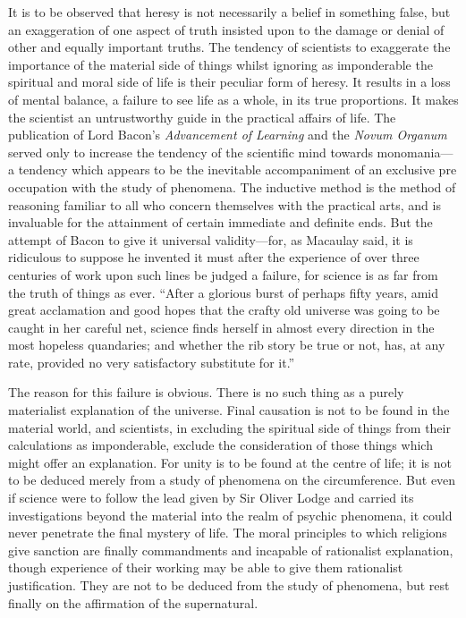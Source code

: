 \documentclass{book}
\begin{document}
It is to be observed that heresy is not necessarily a belief in something false, but an exaggeration of one aspect of truth insisted upon to the damage or denial of other and equally important truths. The tendency of scientists to exaggerate the importance of the material side of things whilst ignoring as imponderable the spiritual and moral side of life is their peculiar form of heresy. It results in a loss of mental balance, a failure to see life as a whole, in its true proportions. It makes the scientist an untrustworthy guide in the practical affairs of life. The publication of Lord Bacon’s \emph{Advancement of Learning} and the \emph{Novum Organum} served only to increase the tendency of the scientific mind towards monomania—a tendency which appears to be the inevitable accompaniment of an exclusive pre occupation with the study of phenomena. The inductive method is the method of reasoning familiar to all who concern themselves with the practical arts, and is invaluable for the attainment of certain immediate and definite ends. But the attempt of Bacon to give it universal validity—for, as Macaulay said, it is ridiculous to suppose he invented it must after the experience of over three centuries of work upon such lines be judged a failure, for science is as far from the truth of things as ever. “After a glorious burst of perhaps fifty years, amid great acclamation and good hopes that the crafty old universe was going to be caught in her careful net, science finds herself in almost every direction in the most hopeless quandaries; and whether the rib story be true or not, has, at any rate, provided no very satisfactory substitute for it.”\footnotemark[10]

The reason for this failure is obvious. There is no such thing as a purely materialist explanation of the universe. Final causation is not to be found in the material world, and scientists, in excluding the spiritual side of things from their calculations as imponderable, exclude the consideration of those things which might offer an explanation. For unity is to be found at the centre of life; it is not to be deduced merely from a study of phenomena on the circumference. But even if science were to follow the lead given by Sir Oliver Lodge and carried its investigations beyond the material into the realm of psychic phenomena, it could never penetrate the final mystery of life. The moral principles to which religions give sanction are finally commandments and incapable of rationalist explanation, though experience of their working may be able to give them rationalist justification. They are not to be deduced from the study of phenomena, but rest finally on the affirmation of the supernatural.
\end{document}
